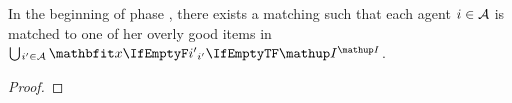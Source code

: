 \begin{lemma}
	\label{lem:overly_good_matching}
	In the beginning of phase \phaseiii*, there exists a matching such that each agent \(i \in \mathcal{A}\) is matched to one of her overly good items in \(\mathop{\bigcup\hspace{-1pt}_{i' \in \agents}} \alloc[\phasei][i']\).
\end{lemma}
\begin{proof}
%
\end{proof}

